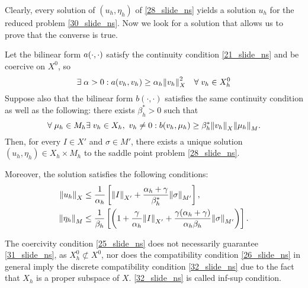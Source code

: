 Clearly, every solution of \((u_h, \eta_h)\) of \eqref{28_slide_ns} yields a solution \(u_h\) for the reduced problem \eqref{30_slide_ns}. Now we look for a solution that allows us to prove that the converse is true.
\begin{theorem}
    Let the bilinear form \(a(\cdot, \cdot)\) satisfy the continuity condition \eqref{21_slide_ns} and be coercive on \(X^0\), so 
    \begin{equation}
        \exists \; \alpha > 0 : a(v_h,v_h) \geq \alpha_h \norm{v_h}_X^2 \quad \forall \; v_h \in X^0_h
        \label{31_slide_ns}
    \end{equation}
    Suppose also that the bilinear form \(b(\cdot,\cdot)\) satisfies the same continuity condition as well as the following: there exists \(\beta_h^* > 0\) such that 
    \begin{equation}
        \forall \; \mu_h \in M_h \exists \; v_h \in X_h, \ v_h\neq 0 : b(v_h,\mu_h) \geq \beta_h^*\norm{v_h}_X\norm{\mu_h}_M.
        \label{32_slide_ns}
    \end{equation}
    Then, for every \(I \in X'\) and \(\sigma \in M'\), there exists a unique solution \((u_h,\eta_h)\in X_h \times M_h\) to the saddle point problem \eqref{28_slide_ns}.

    Moreover, the solution satisfies the following conditions:
    \begin{align}
        \norm{u_h}_X &\leq \frac{1}{\alpha_h} \left[ \norm{I}_{X'} + \frac{\alpha_h + \gamma}{\beta_h^*} \norm{\sigma}_{M'} \right], \label{33_slide_ns}\\
        \norm{\eta_h}_M &\leq \frac{1}{\beta_h} \left[ \left( 1+\frac{\gamma}{\alpha_h} \norm{I}_{X'}+ \frac{\gamma(\alpha_h+\gamma)}{\alpha_h \beta_h} \norm{\sigma}_{M'} \right) \right]. \label{34_slide_ns}
    \end{align}
    \label{uniqueness_discrete}
\end{theorem}
The coercivity condition \eqref{25_slide_ns} does not necessarily guarantee \eqref{31_slide_ns}, as \(X_h^0 \not\subset X^0\), nor does the compatibility condition \eqref{26_slide_ns} in general imply the discrete compatibility condition \eqref{32_slide_ns} due to the fact that \(X_h\) is a proper subspace of \(X\). \eqref{32_slide_ns} is called inf-sup condition.

